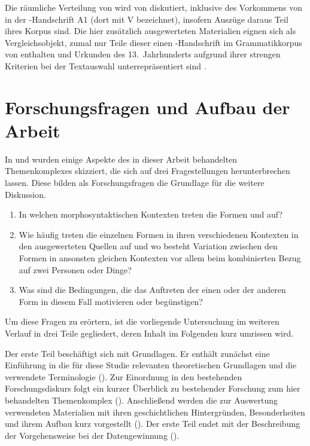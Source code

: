 Die räumliche Verteilung von  wird von
\citet[627--628]{ksw2} diskutiert, inklusive des Vorkommens von
 in der \KC{}-Handschrift A1 (dort mit V
bezeichnet), insofern Auszüge daraus Teil ihres Korpus sind. Die hier
zusätzlich ausgewerteten Materialien eignen sich als Vergleichsobjekt, zumal
nur Teile dieser einen \KC{}-Handschrift im Grammatikkorpus von
\citet{ksw3,ksw2} enthalten und Urkunden des 13.~Jahrhunderts aufgrund ihrer
strengen Kriterien bei der Textauswahl unterrepräsentiert sind
\autocite[1309, 1311]{wegera2000}.

\section{Forschungsfragen und Aufbau der Arbeit}

In  und  wurden einige
Aspekte des in dieser Arbeit behandelten Themenkomplexes skizziert, die sich
auf drei Fragestellungen herunterbrechen lassen. Diese bilden als
Forschungsfragen die Grundlage für die weitere Diskussion.

\begin{enumerate}
	\item In welchen morphosyntaktischen Kontexten treten die Formen
		 und  auf?
	\item Wie häufig treten die einzelnen Formen in ihren verschiedenen
		Kontexten in den ausgewerteten Quellen auf und wo besteht Variation
		zwischen den Formen in ansonsten gleichen Kontexten vor allem beim
		kombinierten Bezug auf zwei Personen oder Dinge?
	\item Was sind die Bedingungen, die das Auftreten der einen oder der
		anderen Form in diesem Fall motivieren oder begünstigen?
\end{enumerate}

Um diese Fragen zu erörtern, ist die vorliegende Untersuchung im weiteren
Verlauf in drei Teile gegliedert, deren Inhalt im Folgenden kurz umrissen wird.

Der erste Teil beschäftigt sich mit Grundlagen. Er enthält zunächst eine
Einführung in die für diese Studie relevanten theoretischen Grundlagen und die
verwendete Terminologie (). Zur Einordnung in den
bestehenden Forschungsdiskurs folgt ein kurzer Überblick zu bestehender
Forschung zum hier behandelten Themenkomplex
(). Anschließend werden die zur Auswertung
verwendeten Materialien mit ihren geschichtlichen Hintergründen, Besonderheiten
und ihrem Aufbau kurz vorgestellt (). Der erste Teil
endet mit der Beschreibung der Vorgehensweise bei der Datengewinnung
().

